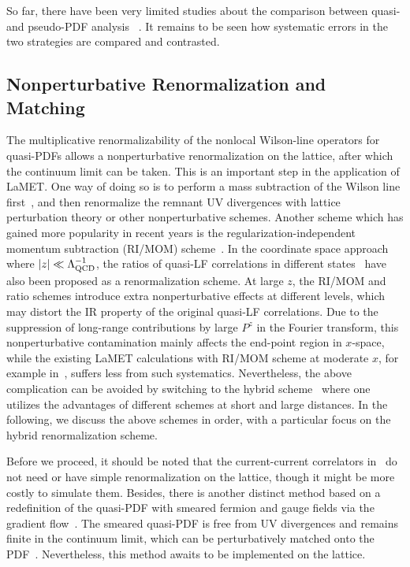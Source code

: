 \documentclass[aps,rmp,reprint,amsmath,amssymb,graphicx,longbibliography]{revtex4-1} %
\begin{document}
So far, there have been very limited studies about the comparison between quasi- and pseudo-PDF analysis
~\cite{Bhat:2020ktg,Alexandrou:2020qtt}. It remains to be seen how systematic errors
in the two strategies are compared and contrasted.

\subsection{Nonperturbative Renormalization and Matching}
\label{sec:renorm-npr}
The multiplicative renormalizability of the nonlocal Wilson-line operators for quasi-PDFs allows a nonperturbative renormalization on the lattice, after which the continuum limit can be taken.
This is an important step in the application of LaMET.
One way of doing so is to perform a mass
subtraction of the Wilson line first~\cite{Musch:2010ka,Ishikawa:2016znu,Chen:2016fxx,Zhang:2017bzy,Green:2017xeu,Green:2020xco}, and then renormalize the remnant UV divergences with lattice perturbation theory or other nonperturbative schemes. Another scheme which has gained more popularity in recent years is the regularization-independent momentum subtraction (RI/MOM) scheme~\cite{Constantinou:2017sej,Stewart:2017tvs,Alexandrou:2017huk,Chen:2017mzz,Liu:2018uuj}.
In the coordinate space approach where $|z|\ll \Lambda_{\rm QCD}^{-1}$, the ratios of quasi-LF correlations in
different states~\cite{Radyushkin:2017cyf,Orginos:2017kos,Braun:2018brg,Li:2020xml} have also been proposed as a renormalization scheme. At large $z$, the RI/MOM and ratio schemes introduce extra nonperturbative effects at different levels, which may distort the IR property of the original quasi-LF correlations. Due to the suppression  of long-range contributions by large $P^z$ in the Fourier transform, this nonperturbative contamination mainly affects the end-point region in $x$-space, while the existing LaMET calculations with RI/MOM scheme at moderate $x$, for example in~\cite{Alexandrou:2018eet,Lin:2018qky}, suffers less from such systematics. Nevertheless, the above complication can be avoided by switching to the hybrid scheme~\cite{Ji:2020brr} where one utilizes the advantages of different schemes at short and large distances.
In the following, we discuss the above schemes in order, with a particular focus on the hybrid renormalization scheme.


Before we proceed, it should be noted that the current-current correlators in~\cite{Detmold:2005gg,Braun:2007wv,Ma:2017pxb} do not need or have simple renormalization on the lattice, though it might be more costly to simulate them. Besides, there is another distinct method based on a redefinition of the quasi-PDF with smeared fermion and gauge fields via the gradient flow~\cite{Monahan:2016bvm}. The smeared quasi-PDF is free from UV divergences and remains finite in the continuum limit, which can be perturbatively matched onto the PDF~\cite{Monahan:2017hpu}. Nevertheless, this method awaits to be implemented on the lattice.
\end{document}
